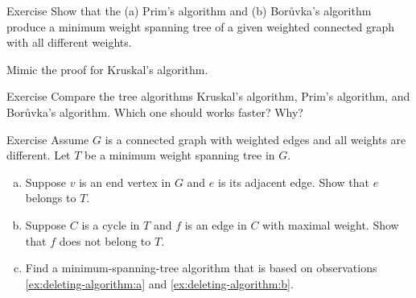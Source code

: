 \begin{thm}{Exercise}
Show that the (a) Prim's algorithm and (b) Borůvka's algorithm produce a minimum weight spanning tree of a given weighted connected graph with all different weights.
\end{thm}

 Mimic the proof for Kruskal’s algorithm.

\begin{thm}{Exercise}
Compare the tree algorithms Kruskal’s algorithm, Prim's algorithm, and Borůvka's algorithm.
Which one should works faster?
Why?
\end{thm}

\begin{thm}{Exercise}\label{ex:deleting-algorithm}
Assume $G$ is a connected graph with weighted edges and all weights are different.
Let $T$ be a minimum weight spanning tree in $G$.
\begin{enumerate}[(a)]
\item\label{ex:deleting-algorithm:a} Suppose $v$ is an end vertex in $G$ and $e$ is its adjacent edge.
Show that $e$ belongs to $T$.
\item\label{ex:deleting-algorithm:b} Suppose $C$ is a cycle in $T$ and $f$ is an edge in $C$ with maximal weight.
Show that $f$ does not belong to $T$.
\item Find a minimum-spanning-tree algorithm that is based on observations \ref{ex:deleting-algorithm:a} and \ref{ex:deleting-algorithm:b}.
\end{enumerate}
\end{thm}


